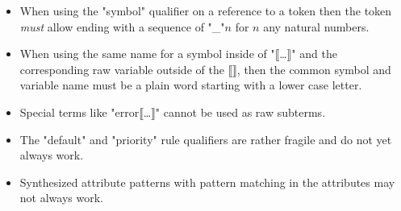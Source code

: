 \documentclass[11pt]{article} %
\begin{document}
\begin{itemize}
\item When using the "symbol" qualifier on a reference to a token then the token \emph{must} allow
  ending with a sequence of "_"$n$ for $n$ any natural numbers.

\item When using the same name for a symbol inside of "⟦…⟧" and the corresponding raw variable
  outside of the ⟦⟧, then the common symbol and variable name must be a plain word starting with a
  lower case letter.

\item Special terms like "error⟦…⟧" cannot be used as raw subterms.

\item The "default" and "priority" rule qualifiers are rather fragile and do not yet always work.

\item Synthesized attribute patterns with pattern matching in the attributes may not always work.

\end{itemize}



\end{document}
